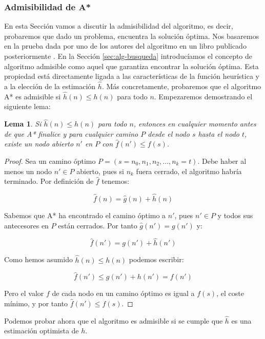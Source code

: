 \documentclass[a4paper,12pt]{article}
\newtheorem{lem}{Lema}
\begin{document}
\subsubsection{Admisibilidad de A*}\label{sec:admisibilidad}

En esta Sección vamos a discutir la admisibilidad del algoritmo, es decir, probaremos que dado un problema, encuentra la solución óptima. Nos basaremos en la prueba dada por uno de los autores del algoritmo en un libro publicado posteriormente \cite[p. 59]{nillsson1971problem}. En la Sección \ref{sec:alg-busqueda} introducíamos el concepto de algoritmo admisible como aquel que garantiza encontrar la solución óptima. Esta propiedad está directamente ligada a las características de la función heurística y a la elección de la estimación $\hat{h}$. Más concretamente, probaremos que el algoritmo A* es admisible si $\hat{h}(n) \leq h(n)$ para todo $n$. Empezaremos demostrando el siguiente lema:

\begin{lem}\label{lem}
Si $\hat{h}(n) \leq h(n)$ para todo $n$, entonces en cualquier momento antes de que A* finalice y para cualquier camino $P$ desde el nodo $s$ hasta el nodo $t$, existe un nodo abierto $n'$ en $P$ con $\hat{f}(n') \leq f(s)$.

\end{lem}

\begin{proof}
Sea un camino óptimo $P = (s=n_0, n_1, n_2, \dots, n_k = t)$. Debe haber al menos un nodo $n' \in P$ abierto, pues si $n_k$ fuera cerrado, el algoritmo habría terminado. Por definición de $\hat{f}$ tenemos:

$$\hat{f}(n) = \hat{g}(n) + \hat{h}(n)$$

\noindent Sabemos que A* ha encontrado el camino óptimo a $n'$, pues $n'\in P$ y todos sus antecesores en $P$ están cerrados. Por tanto $\hat{g}(n') = g(n')$ y:

$$\hat{f}(n') = g(n') + \hat{h}(n')$$

\noindent Como hemos asumido $\hat{h}(n) \leq h(n)$ podemos escribir:

$$\hat{f}(n') \leq g(n') + h(n') = f(n')$$

\noindent Pero el valor $f$ de cada nodo en un camino óptimo es igual a $f(s)$, el coste mínimo, y por tanto $\hat{f}(n') \leq f(s)$.
\end{proof}

Podemos probar ahora que el algoritmo es admisible si se cumple que $\hat{h}$ es una estimación optimista de $h$.
\end{document}
